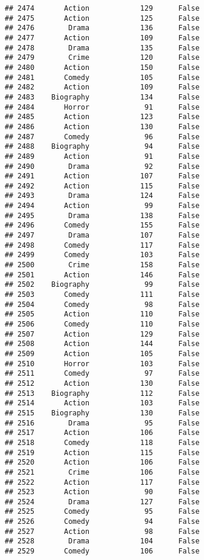 \documentclass[
]{article}
\begin{document}
\begin{verbatim}
## 2474       Action            129      False
## 2475       Action            125      False
## 2476        Drama            136      False
## 2477       Action            109      False
## 2478        Drama            135      False
## 2479        Crime            120      False
## 2480       Action            150      False
## 2481       Comedy            105      False
## 2482       Action            109      False
## 2483    Biography            134      False
## 2484       Horror             91      False
## 2485       Action            123      False
## 2486       Action            130      False
## 2487       Comedy             96      False
## 2488    Biography             94      False
## 2489       Action             91      False
## 2490        Drama             92      False
## 2491       Action            107      False
## 2492       Action            115      False
## 2493        Drama            124      False
## 2494       Action             99      False
## 2495        Drama            138      False
## 2496       Comedy            155      False
## 2497        Drama            107      False
## 2498       Comedy            117      False
## 2499       Comedy            103      False
## 2500        Crime            158      False
## 2501       Action            146      False
## 2502    Biography             99      False
## 2503       Comedy            111      False
## 2504       Comedy             98      False
## 2505       Action            110      False
## 2506       Comedy            110      False
## 2507       Action            129      False
## 2508       Action            144      False
## 2509       Action            105      False
## 2510       Horror            103      False
## 2511       Comedy             97      False
## 2512       Action            130      False
## 2513    Biography            112      False
## 2514       Action            103      False
## 2515    Biography            130      False
## 2516        Drama             95      False
## 2517       Action            106      False
## 2518       Comedy            118      False
## 2519       Action            115      False
## 2520       Action            106      False
## 2521        Crime            106      False
## 2522       Action            117      False
## 2523       Action             90      False
## 2524        Drama            127      False
## 2525       Comedy             95      False
## 2526       Comedy             94      False
## 2527       Action             98      False
## 2528        Drama            104      False
## 2529       Comedy            106      False

\end{verbatim}
\end{document}
